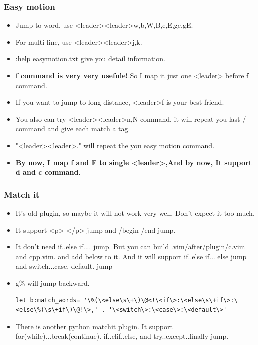 \documentclass[a4paper,12pt,twoside]{book}
\begin{document}
\subsubsection{Easy motion}
\begin{itemize}
		\item Jump to word, use <leader><leader>w,b,W,B,e,E,ge,gE. 

		\item For multi-line, use <leader><leader>j,k.  

		\item :help easymotion.txt give you detail information.

		\item \textbf{f command is very very usefule!}.So I map it just one <leader> before f command. 

		\item If you want to jump to long distance, <leader>f is your best friend. 

		\item You also can try <leader><leader>n,N command, it will repeat you last / command and give each match a tag.

		\item "<leader><leader>."  will repeat the you easy motion command. 

		\item \textbf{By now, I map f and F to single <leader>,And by now, It support d and c command}.
\end{itemize}

\subsubsection{Match it}
\begin{itemize}
		\item It's old plugin, so maybe it will not work very well, Don't expect it too much.
		\item It support <p> </p> jump and /begin /end jump.

		\item It don't need if..else if.... jump. But you can build .vim/after/plugin/c.vim and cpp.vim. and add below to it. And it will support if..else if... else jump and switch...case. default. jump

		\item g\% will jump backward. 
\begin{verbatim}
let b:match_words= '\%(\<else\s\+\)\@<!\<if\>:\<else\s\+if\>:\<else\%(\s\+if\)\@!\>,' . '\<switch\>:\<case\>:\<default\>'
\end{verbatim}

	\item There is another python matchit plugin. It support for(while)...break(continue). if..elif..else, and try..except..finally jump.   
\end{itemize}
\end{document}
